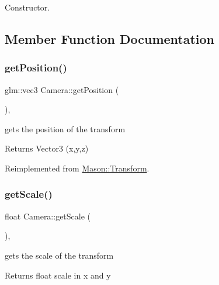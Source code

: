 Constructor. 



\subsection{Member Function Documentation}
\hypertarget{class_mason_1_1_camera_a71560b8b6216a542ae1958bd91a4361d}{}\label{class_mason_1_1_camera_a71560b8b6216a542ae1958bd91a4361d} 
\subsubsection{\texorpdfstring{get\+Position()}{getPosition()}}
{\footnotesize\ttfamily glm\+::vec3 Camera\+::get\+Position (\begin{DoxyParamCaption}{ }\end{DoxyParamCaption})\hspace{0.3cm}{\ttfamily [override]}, {\ttfamily [virtual]}}



gets the position of the transform 

\begin{DoxyReturn}{Returns}
Vector3 (x,y,z) 
\end{DoxyReturn}


Reimplemented from \hyperlink{class_mason_1_1_transform_a0b21f641e72d7b55f3a630b986d0b106}{Mason\+::\+Transform}.

\hypertarget{class_mason_1_1_camera_a9c86fd4a182c472001f5d52e99fc0bbc}{}\label{class_mason_1_1_camera_a9c86fd4a182c472001f5d52e99fc0bbc} 
\subsubsection{\texorpdfstring{get\+Scale()}{getScale()}}
{\footnotesize\ttfamily float Camera\+::get\+Scale (\begin{DoxyParamCaption}{ }\end{DoxyParamCaption})\hspace{0.3cm}{\ttfamily [override]}, {\ttfamily [virtual]}}



gets the scale of the transform 

\begin{DoxyReturn}{Returns}
float scale in x and y 
\end{DoxyReturn}


